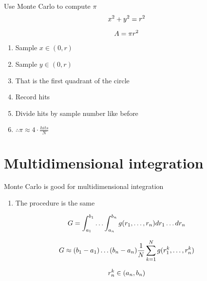 \documentclass[aspectratio=1610,pdftex,dvipsnames,compress,xcolor={dvipsnames}]{beamer}
\begin{document}
\addtocounter{framenumber}{-1} 
\begin{frame}{Use Monte Carlo to compute $\pi$}
    \begin{equation}
        \LARGE
        x^2 + y^2 = r^2
    \end{equation}

    \begin{equation}
        \LARGE
        A = \pi r^2
    \end{equation}

    \vspace*{\fill}

    \begin{enumerate}[series=outerlist,topsep=0pt,itemsep=11pt,leftmargin=*,label=(\arabic*)]
        \item[]Sample $x \in (0,r)$
        \item[]Sample $y \in (0,r)$
        \item[]That is the first quadrant of the circle
        \item[]Record hits
        \item[]Divide hits by sample number like before
        \item[]\Large $\therefore \pi \approx 4 \cdot \frac{hits}{N}$
    \end{enumerate}
\end{frame}


\section{Multidimensional integration}


\addtocounter{framenumber}{-1} 
\begin{frame}{Monte Carlo is good for multidimensional integration}
    \begin{enumerate}[series=outerlist,topsep=0pt,itemsep=21pt,leftmargin=*,label=(\arabic*)]
        \item[]The procedure is the same
    \end{enumerate}

    \vspace*{\fill}

    \begin{equation}
        \LARGE
        G = \int_{a_1}^{b_1} \ldots \int_{a_n}^{b_n} g(r_1, \ldots ,r_n) dr_1 \ldots dr_n
    \end{equation}

    \begin{equation}
        \LARGE
        G \approx (b_1-a_1) \ldots (b_n-a_n) \frac{1}{N} \sum_{k=1}^N g(r_1^k, \ldots ,r_n^k)
    \end{equation}

    \begin{equation}
        \LARGE
        r_n^k \in (a_n,b_n)
    \end{equation}
\end{frame}
\end{document}
